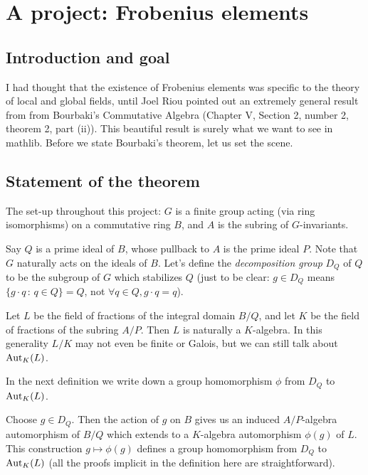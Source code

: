 \chapter{A project: Frobenius elements}

\section{Introduction and goal}

I had thought that the existence of Frobenius elements was specific to the theory
of local and global fields, until Joel Riou pointed out
an extremely general result from from Bourbaki's Commutative Algebra
(Chapter V, Section 2, number 2, theorem 2, part (ii)). This beautiful
result is surely what we want to see in mathlib. Before we state Bourbaki's
theorem, let us set the scene.

\section{Statement of the theorem}

The set-up throughout this project:
$G$ is a finite group acting (via ring isomorphisms) on a commutative ring $B$,
and $A$ is the subring of $G$-invariants.

Say $Q$ is a prime ideal of $B$, whose pullback to $A$ is the prime ideal $P$.
Note that $G$ naturally acts on the ideals of $B$. Let's define the
\emph{decomposition group} $D_Q$ of $Q$ to be the subgroup of $G$ which
stabilizes $Q$ (just to be clear: $g\in D_Q$ means
$\{g\cdot q\, :\, q \in Q\}=Q$, not $\forall q\in Q, g\cdot q=q$).

Let $L$ be the field of fractions of the integral domain $B/Q$, and let $K$ be the
field of fractions of the subring $A/P$. Then $L$ is naturally a $K$-algebra.
In this generality $L/K$ may not even be finite or Galois, but we can still talk about
$\operatorname{Aut}_K(L)$.

In the next definition we write down a group homomorphism $\phi$ from $D_Q$ to $\operatorname{Aut}_K(L)$.

\begin{definition}
  \label{Bourbaki52222.stabilizer.toGaloisGroup}
  Choose $g\in D_Q$. Then the action of $g$ on $B$ gives us an induced
  $A/P$-algebra automorphism of $B/Q$ which extends to a $K$-algebra automorphism $\phi(g)$ of $L$.
  This construction $g\mapsto \phi(g)$ defines a group homomorphism from $D_Q$
  to $\operatorname{Aut}_K(L)$ (all the proofs implicit in the definition here are straightforward).
  \leanok
\end{definition}

